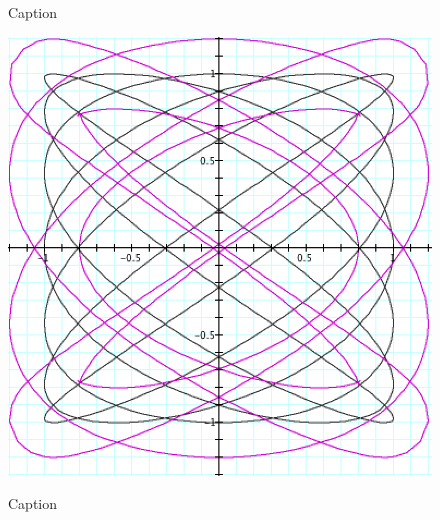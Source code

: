 {\begin{figure}[H]
\begin{minipage}[b]{\w}
      \caption{Caption}
      \vspace{4ex}
    \end{minipage} %
    \begin{minipage}[b]{\w}
      \centering
      \label{parametric:6}
      \includegraphics[width=\fw]{img/15-parametric/06.png}
      \caption{Caption}
      \vspace{4ex}
    \end{minipage} %
  \end{figure}

}

